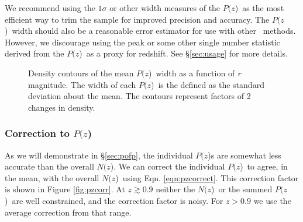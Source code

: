 \documentclass[12pt,preprint]{aastex}
\newcommand{\pofz}{$P(z$)}
\newcommand{\nofz}{$N(z$)}
\begin{document}
We recommend using the $1 \sigma$ or other width measures of the \pofz\ as the
most efficient way to trim the sample for improved precision and accuracy.  The
\pofz\ width should also be a reasonable error estimator for use with other
\photoz\ methods.  However, we discourage using the peak or some other single
number statistic derived from the \pofz\ as a proxy for redshift. See 
\S \ref{sec:usage} for more details.

\begin{figure}[p]\centering
    \caption{Density contours of the mean \pofz\ width as a function of {\it r} magnitude. 
The width of each \pofz\ is the defined as the standard deviation about the mean. 
The contours represent factors of 2 changes in density.}
    \label{fig:pzwidth}
    \vspace{2em}
\end{figure}

\subsubsection{Correction to \pofz} \label{sec:pzcorr}

As we will demonstrate in \S \ref{sec:pofp}, the individual \pofz s are
somewhat less accurate than the overall \nofz.  We can correct the individual
\pofz\ to agree, in the mean, with the overall \nofz\ using Eqn.
\ref{eqn:pzcorrect}.  This correction factor is shown in Figure
\ref{fig:pzcorr}.  At $z \gtrsim 0.9$ neither the \nofz\ or the summed
\pofz\ are well constrained, and the correction factor is noisy.  For $z > 0.9$
we use the average correction from that range.
\end{document}

